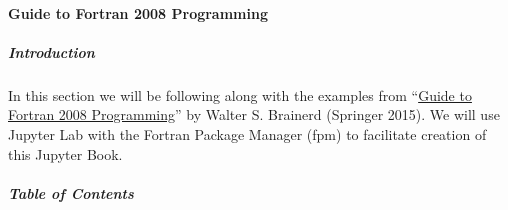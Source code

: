 \paragraph{Guide to Fortran 2008 Programming}

\subparagraph{Introduction}

In this section we will be following along with the examples from ``\href{https://amzn.to/3BOhTOd}{Guide to Fortran 2008 Programming}'' by Walter S. Brainerd (Springer 2015). We will use Jupyter Lab with the Fortran Package Manager (fpm) to facilitate creation of this Jupyter Book.

\subparagraph{Table of Contents}